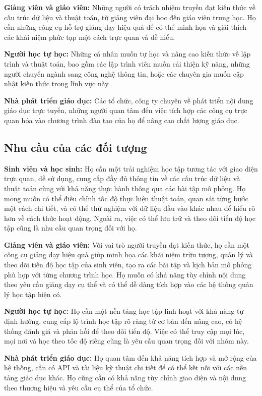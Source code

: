 \textbf{Giảng viên và giáo viên:} Những người có trách nhiệm truyền đạt kiến thức về cấu trúc dữ liệu và thuật toán, từ giảng viên đại học đến giáo viên trung học. Họ cần những công cụ hỗ trợ giảng dạy hiệu quả để có thể minh họa và giải thích các khái niệm phức tạp một cách trực quan và dễ hiểu.

\textbf{Người học tự học:} Những cá nhân muốn tự học và nâng cao kiến thức về lập trình và thuật toán, bao gồm các lập trình viên muốn cải thiện kỹ năng, những người chuyển ngành sang công nghệ thông tin, hoặc các chuyên gia muốn cập nhật kiến thức trong lĩnh vực này.

\textbf{Nhà phát triển giáo dục:} Các tổ chức, công ty chuyên về phát triển nội dung giáo dục trực tuyến, những người quan tâm đến việc tích hợp các công cụ trực quan hóa vào chương trình đào tạo của họ để nâng cao chất lượng giáo dục.

\subsection{Nhu cầu của các đối tượng}
\label{subsec:needs}

\textbf{Sinh viên và học sinh:} Họ cần một trải nghiệm học tập tương tác với giao diện trực quan, dễ sử dụng, cung cấp đầy đủ thông tin về các cấu trúc dữ liệu và thuật toán cùng với khả năng thực hành thông qua các bài tập mô phỏng. Họ mong muốn có thể điều chỉnh tốc độ thực hiện thuật toán, quan sát từng bước một cách chi tiết, và có thể thử nghiệm với dữ liệu đầu vào khác nhau để hiểu rõ hơn về cách thức hoạt động. Ngoài ra, việc có thể lưu trữ và theo dõi tiến độ học tập cũng là nhu cầu quan trọng đối với họ.

\textbf{Giảng viên và giáo viên:} Với vai trò người truyền đạt kiến thức, họ cần một công cụ giảng dạy hiệu quả giúp minh họa các khái niệm trừu tượng, quản lý và theo dõi tiến độ học tập của sinh viên, tạo ra các bài tập và kịch bản mô phỏng phù hợp với từng chương trình học. Họ muốn có khả năng tùy chỉnh nội dung theo yêu cầu giảng dạy cụ thể và có thể dễ dàng tích hợp vào các hệ thống quản lý học tập hiện có.

\textbf{Người học tự học:} Họ cần một nền tảng học tập linh hoạt với khả năng tự định hướng, cung cấp lộ trình học tập rõ ràng từ cơ bản đến nâng cao, có hệ thống đánh giá và phản hồi để theo dõi tiến độ. Việc có thể truy cập mọi lúc, mọi nơi và học theo tốc độ riêng cũng là yêu cầu quan trọng đối với nhóm này.

\textbf{Nhà phát triển giáo dục:} Họ quan tâm đến khả năng tích hợp và mở rộng của hệ thống, cần có API và tài liệu kỹ thuật chi tiết để có thể kết nối với các nền tảng giáo dục khác. Họ cũng cần có khả năng tùy chỉnh giao diện và nội dung theo thương hiệu và yêu cầu cụ thể của tổ chức.

